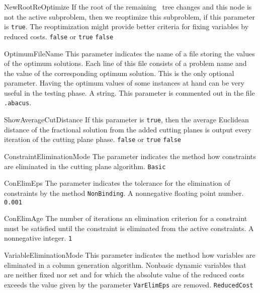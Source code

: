 \parameter
{NewRootReOptimize}
{If
 the root of the remaining \bab\ tree changes and this node
 is not the active subproblem, then we reoptimize this subproblem,
 if this parameter is {\tt true}. The reoptimization might provide
 better criteria for fixing variables by reduced costs.
}
{{\tt false} or {\tt true}}
{{\tt false}}

\parameter
{OptimumFileName}
{This
 parameter indicates the name of a file storing the values of the
 optimum solutions. Each line of this file consists of a problem name
 and the value of the corresponding optimum solution.
 This is the only optional parameter. Having the optimum values of
 some instances at hand can be very useful in the testing phase.
}
{A string.}
{This parameter is commented out in the file {\tt .abacus}.}

\parameter
{ShowAverageCutDistance}
{If
 this parameter is {\tt true}, then the average Euclidean distance of the
 fractional solution from the added cutting planes is output every iteration
 of the cutting plane phase. 
}
{{\tt false} or {\tt true}}
{{\tt false}}

\parameter
{ConstraintEliminationMode}
{The
  parameter indicates the method how constraints are eliminated in the 
 cutting plane algorithm.}
{
}
{{\tt Basic}}

\parameter
{ConElimEps}
{The
 parameter indicates the tolerance for the elimination of constraints
 by the method {\tt NonBinding}.}
{A nonnegative floating point number.}
{{\tt 0.001}}

\parameter
{ConElimAge}
{The number of iterations an elimination criterion for a constraint
 must be satisfied until the constraint is eliminated from the active
 constraints.}
{A nonnegative integer.}
{{\tt 1}}

\parameter
{VariableEliminationMode}
{This
 parameter indicates the method how variables are eliminated in a 
 column generation algorithm.}
{
                 {Nonbasic dynamic variables that are neither fixed nor set
                  and for which the absolute value of the
                  reduced costs exceeds the value given by the parameter
                  {\tt VarElimEps} are removed.
                 }
}
{{\tt ReducedCost}}

